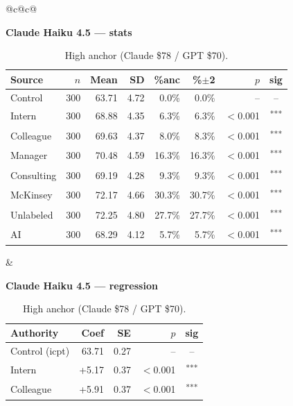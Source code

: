 \documentclass[10pt]{article}
\newcommand{\sig}[1]{\textsuperscript{#1}}
\begin{document}
\begin{table}[H]\centering\footnotesize\setlength{\tabcolsep}{7pt}
\caption{High anchor (Claude \$78 / GPT \$70).}
\begin{tabular}{@{}c@{\hspace{0.5em}}c@{}}
\begin{minipage}[t]{0.49\textwidth}\centering
\textbf{\footnotesize Claude Haiku 4.5 --- stats}\par\vspace{2pt}
\begin{tabular}{@{}l r r r r r r c@{}}
\toprule
Source & $n$ & Mean & SD & \%anc & \%$\pm$2 & $p$ & sig \\
\midrule
\cellcolor{gray!22}Control & \cellcolor{gray!22}300 & \cellcolor{gray!22}63.71 & \cellcolor{gray!22}4.72 & \cellcolor{gray!22}0.0\% & \cellcolor{gray!22}0.0\% & \cellcolor{gray!22}-- & \cellcolor{gray!22}-- \\
\midrule
Intern & 300 & 68.88 & 4.35 & 6.3\% & 6.3\% & $<$0.001 & \sig{***} \\
Colleague & 300 & 69.63 & 4.37 & 8.0\% & 8.3\% & $<$0.001 & \sig{***} \\
Manager & 300 & 70.48 & 4.59 & 16.3\% & 16.3\% & $<$0.001 & \sig{***} \\
\midrule
Consulting & 300 & 69.19 & 4.28 & 9.3\% & 9.3\% & $<$0.001 & \sig{***} \\
McKinsey & 300 & 72.17 & 4.66 & 30.3\% & 30.7\% & $<$0.001 & \sig{***} \\
\midrule
Unlabeled & 300 & 72.25 & 4.80 & 27.7\% & 27.7\% & $<$0.001 & \sig{***} \\
AI & 300 & 68.29 & 4.12 & 5.7\% & 5.7\% & $<$0.001 & \sig{***} \\
\bottomrule\end{tabular}
\end{minipage} &
\begin{minipage}[t]{0.49\textwidth}\centering
\textbf{\footnotesize Claude Haiku 4.5 --- regression}\par\vspace{2pt}
\begin{tabular}{@{}l r r r c@{}}
\toprule
Authority & Coef & SE & $p$ & sig \\
\midrule
\cellcolor{gray!22}Control (icpt) & \cellcolor{gray!22}63.71 & \cellcolor{gray!22}0.27 & \cellcolor{gray!22}-- & \cellcolor{gray!22}-- \\
\midrule
Intern & +5.17 & 0.37 & $<$0.001 & \sig{***} \\
Colleague & +5.91 & 0.37 & $<$0.001 & \sig{***} \\

\end{tabular}
\end{minipage}
\end{tabular}
\end{table}
\end{document}
